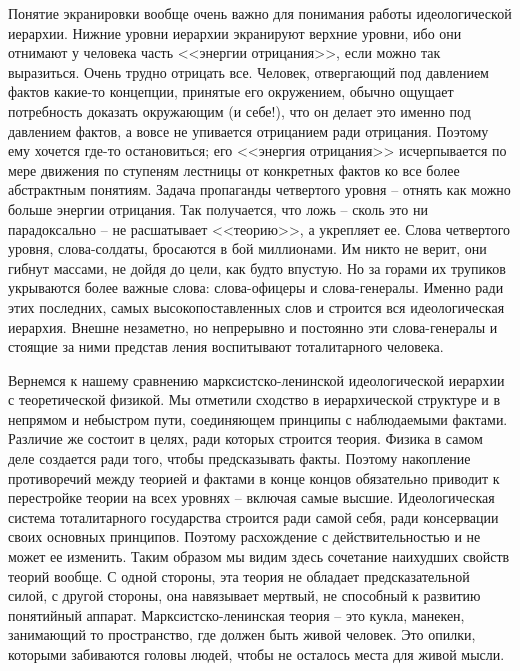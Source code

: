 \documentclass{book}
\begin{document}
Понятие экранировки вообще очень важно для понимания работы идеологической иерархии. Нижние уровни иерархии экранируют верхние 
уровни, ибо они отнимают у человека часть <<энергии отрицания>>, если можно так выразиться. Очень трудно отрицать все. Человек, 
отвергающий под давлением фактов какие-то концепции, принятые его окружением, обыч­но ощущает потребность доказать окружающим (и 
себе!), что он делает это именно под давлением фактов, а вовсе не упива­ется отрицанием ради отрицания. Поэтому ему хочется 
где-то остановиться; его <<энергия отрицания>> исчерпывается по мере движения по ступеням лестницы от конкретных фактов ко все 
более абстрактным понятиям. Задача пропаганды четвер­того уровня -- отнять как можно больше энергии отрицания. Так получается, 
что ложь -- сколь это ни парадоксально -- не расшатывает <<теорию>>, а укрепляет ее. Слова четвертого уров­ня, слова-солдаты, 
бросаются в бой миллионами. Им никто не верит, они гибнут массами, не дойдя до цели, как будто впустую. Но за горами их трупиков 
укрываются более важные слова: слова-офицеры и слова-генералы. Именно ради этих последних, самых высокопоставленных слов и 
строится вся идеологическая иерархия. Внешне незаметно, но непрерывно и постоянно эти слова-генералы и стоящие за ними представ­
ления воспитывают тоталитарного человека.

Вернемся к нашему сравнению марксистско-ленинской идеологической иерархии с теоретической физикой. Мы отме­тили сходство в 
иерархической структуре и в непрямом и не­быстром пути, соединяющем принципы с наблюдаемыми фак­тами. Различие же состоит в целях, 
ради которых строится теория. Физика в самом деле создается ради того, чтобы пред­сказывать факты. Поэтому накопление 
противоречий между теорией и фактами в конце концов обязательно приводит к пе­рестройке теории на всех уровнях -- включая самые 
высшие. Идеологическая система тоталитарного государства строится ради самой себя, ради консервации своих основных принци­пов. 
Поэтому расхождение с действительностью и не может ее изменить. Таким образом мы видим здесь сочетание наихуд­ших свойств теорий 
вообще. С одной стороны, эта теория не обладает предсказательной силой, с другой стороны, она навя­зывает мертвый, не способный к 
развитию понятийный аппа­рат. Марксистско-ленинская теория -- это кукла, манекен, занимающий то пространство, где должен быть 
живой человек. Это опилки, которыми забиваются головы людей, чтобы не осталось места для живой мысли.
\end{document}
